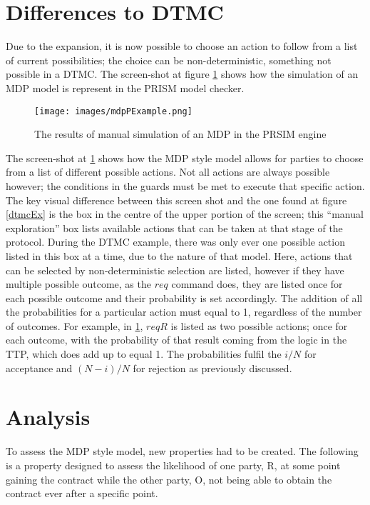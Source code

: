 \documentclass{l4proj}
\begin{document}
\section{Differences to DTMC}

Due to the expansion, it is now possible to choose an action to follow from a list of current possibilities; the choice can be non-deterministic, something not possible in a DTMC. The screen-shot at figure \ref{mdpPEx} shows how the simulation of an MDP model is represent in the PRISM model checker.

\begin{figure}[ht!]
\centering
\texttt{[image: images/mdpPExample.png]}
\caption{The results of manual simulation of an MDP in the PRSIM engine}
\label{mdpPEx}
\end{figure}

The screen-shot at \ref{mdpPEx} shows how the MDP style model allows for parties to choose from a list of different possible actions. Not all actions are always possible however; the conditions in the guards must be met to execute that specific action. The key visual difference between this screen shot and the one found at figure \ref{dtmcEx} is the box in the centre of the upper portion of the screen; this ``manual exploration'' box lists available actions that can be taken at that stage of the protocol. During the DTMC example, there was only ever one possible action listed in this box at a time, due to the nature of that model. Here, actions that can be selected by non-deterministic selection are listed, however if they have multiple possible outcome, as the $req$ command does, they are listed once for each possible outcome and their probability is set accordingly. The addition of all the probabilities for a particular action must equal to 1, regardless of the number of outcomes. For example, in \ref{mdpPEx}, $reqR$ is listed as two possible actions; once for each outcome, with the probability of that result coming from the logic in the TTP, which does add up to equal 1. The probabilities fulfil the $i/N$ for acceptance and $(N-i)/N$ for rejection as previously discussed.


\section{Analysis}
 
 
To assess the MDP style model, new properties had to be created. The following is a property designed to assess the likelihood of one party, R, at some point gaining the contract while the other party, O, not being able to obtain the contract ever after a specific point.
\end{document}
